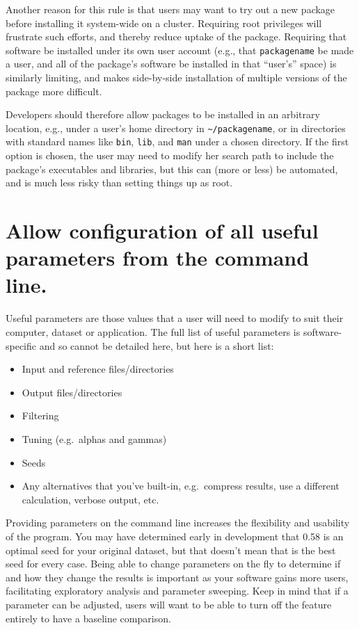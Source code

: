 \documentclass[10pt]{article}
\begin{document}
Another reason for this rule is that users may want to try out a new
package before installing it system-wide on a cluster. Requiring root
privileges will frustrate such efforts, and thereby reduce uptake of the
package. Requiring that software be installed under its own user account
(e.g., that \texttt{packagename} be made a user, and all of the
package's software be installed in that ``user's'' space) is similarly
limiting, and makes side-by-side installation of multiple versions of
the package more difficult.

Developers should therefore allow packages to be installed in an
arbitrary location, e.g., under a user's home directory in
\texttt{\textasciitilde{}/packagename}, or in directories with standard
names like \texttt{bin}, \texttt{lib}, and \texttt{man} under a chosen
directory. If the first option is chosen, the user may need to modify
her search path to include the package's executables and libraries, but
this can (more or less) be automated, and is much less risky than
setting things up as root.

\section{Allow configuration of all useful parameters from the command line.}

Useful parameters are those values that a user will need to modify to suit
their computer, dataset or application. 
The full list of useful parameters is software-specific and so cannot be
detailed here, but here is a short list:

\begin{itemize}
\item
  Input and reference files/directories
\item
  Output files/directories
\item
  Filtering
\item
  Tuning (e.g.~alphas and gammas)
\item
  Seeds
\item
  Any alternatives that you've built-in, e.g.~compress results, use a
  different calculation, verbose output, etc.
\end{itemize}

Providing parameters on the
command line increases the flexibility and usability of the program. You
may have determined early in development that 0.58 is an optimal seed for your
original dataset, but that doesn't mean that is the best seed for every
case. Being able to change parameters on the fly to determine if and how
they change the results is important as your software gains more users,
facilitating exploratory analysis and parameter sweeping. Keep in mind
that if a parameter can be adjusted, users will want to be able to turn
off the feature entirely to have a baseline comparison.
\end{document}
